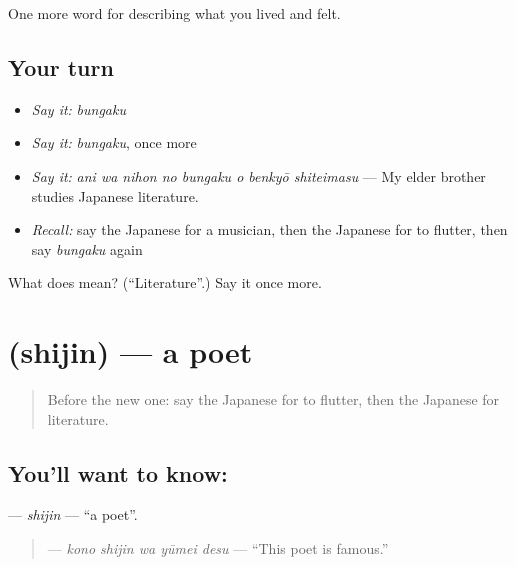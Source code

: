 \begin{grammarlens}[title={What you've built}]
One more word for describing what you lived and felt.
\end{grammarlens}

\subsection*{Your turn}
\begin{itemize}
\raggedright
  \item \emph{Say it:} \emph{bungaku}
  \item \emph{Say it:} \emph{bungaku}, once more
  \item \emph{Say it:} \emph{ani wa nihon no bungaku o benkyō shiteimasu} — My elder brother studies Japanese literature.
  \item \emph{Recall:} say the Japanese for a musician, then the Japanese for to flutter, then say \emph{bungaku} again
\end{itemize}

\begin{tcolorbox}[breakable,colback=teal!4,colframe=teal!35!black,title={Before you move on}]
What does  mean? (\textquotedblleft{}Literature\textquotedblright{}.) Say it once more.
\end{tcolorbox}
\section[\texorpdfstring{\ja{しじん} (shijin)}{しじん (shijin)}]{ (shijin) — a poet}

\label{lesson:JA-C504-shijin}



\begin{quote}
Before the new one: say the Japanese for to flutter, then the Japanese for literature.
\end{quote}

\subsection*{You'll want to know: }
\textbf{} — \emph{shijin} — \textquotedblleft{}a poet\textquotedblright{}.

\begin{quote}
\textbf{  } — \emph{kono shijin wa yūmei desu} — \textquotedblleft{}This poet is famous.\textquotedblright{}
\end{quote}


